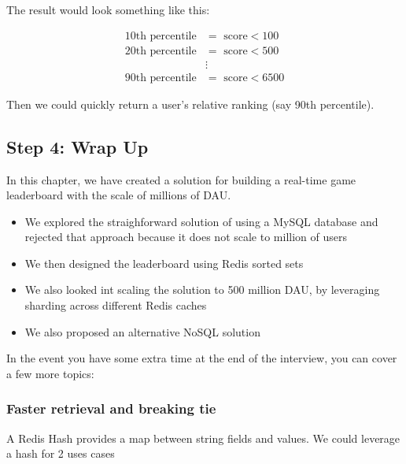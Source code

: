 \documentclass{report}
\theoremstyle{definition}
\let\oldsubsection\subsection
\let\oldsubsubsection\subsubsection
\renewcommand{\subsection}{\oldsubsection*}
\renewcommand{\subsubsection}{\oldsubsubsection*}
\begin{document}
The result would look something like this:

\begin{align*}
10\text{th percentile} &= \text{ score} < 100 \\
20\text{th percentile} &= \text{ score} < 500 \\
& \vdots \\
90\text{th percentile} &= \text{ score} < 6500
\end{align*}

Then we could quickly return a user's relative ranking (say 90th percentile).

\subsection{Step 4: Wrap Up}

In this chapter, we have created a solution for building a real-time game leaderboard with the scale of millions of DAU.

\begin{itemize}
\item
We explored the straighforward solution of using a MySQL database and rejected that approach because it does not scale to million of users
\item
We then designed the leaderboard using Redis sorted sets
\item
We also looked int scaling the solution to 500 million DAU, by leveraging sharding across different Redis caches
\item
We also proposed an alternative NoSQL solution
\end{itemize}

In the event you have some extra time at the end of the interview, you can cover a few more topics:

\subsubsection{Faster retrieval and breaking tie}

A Redis Hash provides a map between string fields and values. We could leverage a hash for 2 uses cases
\end{document}
